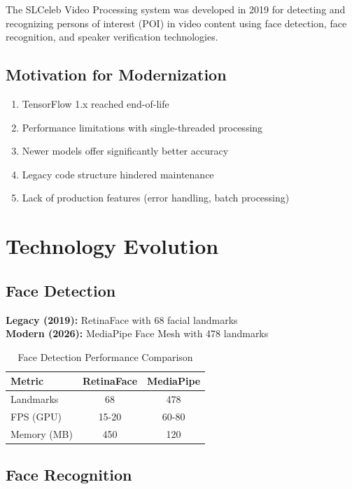 \documentclass[12pt,a4paper]{article}
\begin{document}
The SLCeleb Video Processing system was developed in 2019 for detecting and recognizing persons of interest (POI) in video content using face detection, face recognition, and speaker verification technologies.

\subsection{Motivation for Modernization}
\begin{enumerate}
\item TensorFlow 1.x reached end-of-life
\item Performance limitations with single-threaded processing
\item Newer models offer significantly better accuracy
\item Legacy code structure hindered maintenance
\item Lack of production features (error handling, batch processing)
\end{enumerate}

\section{Technology Evolution}

\subsection{Face Detection}

\textbf{Legacy (2019):} RetinaFace with 68 facial landmarks\\
\textbf{Modern (2026):} MediaPipe Face Mesh with 478 landmarks

\begin{table}[H]
\centering
\caption{Face Detection Performance Comparison}
\begin{tabular}{lcc}
\toprule
\textbf{Metric} & \textbf{RetinaFace} & \textbf{MediaPipe} \\
\midrule
Landmarks & 68 & 478 \\
FPS (GPU) & 15-20 & 60-80 \\
Memory (MB) & 450 & 120 \\
\bottomrule
\end{tabular}
\end{table}

\subsection{Face Recognition}
\end{document}
